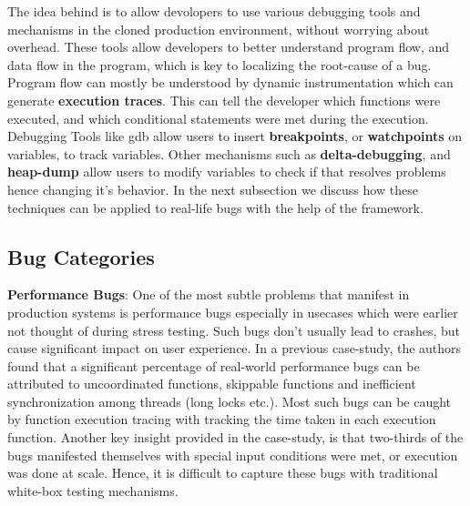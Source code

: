 The idea behind \parikshan is to allow devolopers to use various debugging tools and mechanisms in the cloned production environment, without worrying about overhead.
These tools allow developers to better understand program flow, and data flow in the program, which is key to localizing the root-cause of a bug.
Program flow can mostly be understood by dynamic instrumentation which can generate \textbf{execution traces}. 
This can tell the developer which functions were executed, and which conditional statements were met during the execution.
Debugging Tools like gdb allow users to insert \textbf{breakpoints}, or \textbf{watchpoints} on variables, to track variables.
Other mechanisms such as \textbf{delta-debugging}, and \textbf{heap-dump} allow users to modify variables to check if that resolves problems hence changing it's behavior.
In the next subsection we discuss how these techniques can be applied to real-life bugs with the help of the \parikshan framework.

\subsection{Bug Categories}
\label{sec:bugCategories}


\textbf{Performance Bugs}: One of the most subtle problems that manifest in production systems is performance bugs especially in usecases which were earlier not thought of during stress testing.
Such bugs don't usually lead to crashes, but cause significant impact on user experience.
In a previous case-study\cite{shanluPerf}, the authors found that a significant percentage of real-world performance bugs can be attributed to uncoordinated functions, skippable functions and inefficient synchronization among threads (long locks etc.).
Most such bugs can be caught by function execution tracing with tracking the time taken in each execution function.
Another key insight provided in the case-study, is that two-thirds of the bugs manifested themselves with special input conditions were met, or execution was done at scale. 
Hence, it is difficult to capture these bugs with traditional white-box testing mechanisms.

